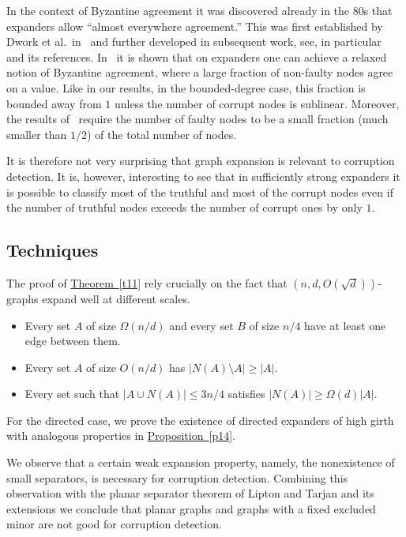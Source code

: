 \documentclass[11pt]{article}
\numberwithin{equation}{section}
\theoremstyle{definition}
\theoremstyle{plain}
\newcommand{\expref}[2]{\hyperref[#2]{#1~\ref{#2}}}
\begin{document}
In the context of Byzantine agreement it was discovered already
in the 80s that expanders allow ``almost everywhere agreement.'' This
was first established by Dwork et al.\ in~\cite{DPPU} and  further 
developed in subsequent work, see, in particular~\cite{GO} and its 
references. In~\cite{DPPU} it is shown that on expanders 
one can achieve a relaxed notion of 
Byzantine agreement, where a large fraction of non-faulty nodes agree 
on a value. Like in our results, in the 
%
bounded-degree case,   %
this fraction is bounded away from $1$ 
unless the number of corrupt nodes is sublinear. 
Moreover, the results of~\cite{DPPU} require the number of 
faulty nodes to be a small fraction 
(much smaller than $1/2$) of the total number of nodes. 

It is therefore not very surprising that graph 
expansion is relevant to corruption detection. It is, however, interesting
to see that in sufficiently strong expanders it is possible to classify
most of the truthful and most of the corrupt nodes even if the number of
truthful nodes exceeds the number of corrupt ones by only $1$.

\subsection{Techniques} 

The proof of \expref{Theorem}{t11} rely crucially on the fact that $(n,d,O(\sqrt{d}))$-graphs expand well at different scales.  
%
%
%
%
%
%
\begin{itemize}
\item Every set $A$ of size $\Omega(n/d)$ and every set $B$ of size $n/4$ have at least one edge between them.
\item Every set $A$ of size $O(n/d)$ has $|N(A) \setminus A| \geq |A|$.  
\item Every set such that $|A \cup N(A)| \leq 3n/4$ satisfies $|N(A)| \geq \Omega(d) |A|$. 
\end{itemize} 

%
%
%
%
%
%
%
%

For the directed case, we prove the existence of directed expanders of high girth with analogous properties in 
\expref{Proposition}{p14}.

%
%
%
%
%
%
%
%
%
%
%
%
%
%
%
We observe that a certain weak expansion property, 
namely, the nonexistence of small separators, is 
necessary for corruption detection.
Combining this observation with the 
planar separator theorem of Lipton and Tarjan and its extensions
we conclude that planar graphs and graphs with a fixed excluded minor 
are not good for corruption detection. 
\end{document}

